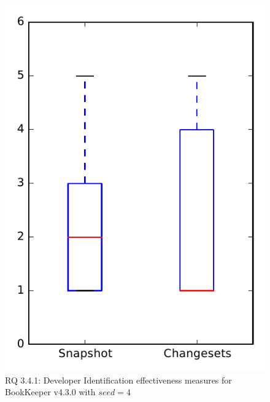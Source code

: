 
\begin{figure}
\centering
\includegraphics[height=0.4\textheight]{figures/dit_seed/rq1_bookkeeper_4}
\caption{RQ 3.4.1: Developer Identification effectiveness measures for BookKeeper v4.3.0 with $seed=4$}
\label{fig:dit_seed:rq1:bookkeeper}
\end{figure}
